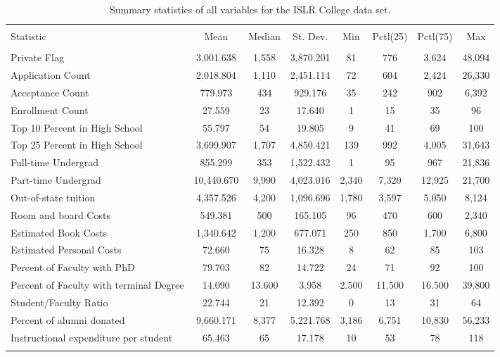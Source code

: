\documentclass{article}\usepackage[]{graphicx}\usepackage[]{color}
\begin{document}

\begin{table} \centering 
  \caption{Summary statistics of all variables for the ISLR College data set.} 
  \label{descrips} 
\begin{tabular}{@{\extracolsep{5pt}}lccccccc} 
\\[-1.8ex]\hline 
\hline \\[-1.8ex] 
Statistic & \multicolumn{1}{c}{Mean} & \multicolumn{1}{c}{Median} & \multicolumn{1}{c}{St. Dev.} & \multicolumn{1}{c}{Min} & \multicolumn{1}{c}{Pctl(25)} & \multicolumn{1}{c}{Pctl(75)} & \multicolumn{1}{c}{Max} \\ 
\hline \\[-1.8ex] 
Private Flag & 3,001.638 & 1,558 & 3,870.201 & 81 & 776 & 3,624 & 48,094 \\ 
Application Count & 2,018.804 & 1,110 & 2,451.114 & 72 & 604 & 2,424 & 26,330 \\ 
Acceptance Count & 779.973 & 434 & 929.176 & 35 & 242 & 902 & 6,392 \\ 
Enrollment Count & 27.559 & 23 & 17.640 & 1 & 15 & 35 & 96 \\ 
Top 10 Percent in High School & 55.797 & 54 & 19.805 & 9 & 41 & 69 & 100 \\ 
Top 25 Percent in High School & 3,699.907 & 1,707 & 4,850.421 & 139 & 992 & 4,005 & 31,643 \\ 
Full-time Undergrad & 855.299 & 353 & 1,522.432 & 1 & 95 & 967 & 21,836 \\ 
Part-time Undergrad & 10,440.670 & 9,990 & 4,023.016 & 2,340 & 7,320 & 12,925 & 21,700 \\ 
Out-of-state tuition & 4,357.526 & 4,200 & 1,096.696 & 1,780 & 3,597 & 5,050 & 8,124 \\ 
Room and board Costs & 549.381 & 500 & 165.105 & 96 & 470 & 600 & 2,340 \\ 
Estimated Book Costs & 1,340.642 & 1,200 & 677.071 & 250 & 850 & 1,700 & 6,800 \\ 
Estimated Personal Costs & 72.660 & 75 & 16.328 & 8 & 62 & 85 & 103 \\ 
Percent of Faculty with PhD & 79.703 & 82 & 14.722 & 24 & 71 & 92 & 100 \\ 
Percent of Faculty with terminal Degree & 14.090 & 13.600 & 3.958 & 2.500 & 11.500 & 16.500 & 39.800 \\ 
Student/Faculty Ratio & 22.744 & 21 & 12.392 & 0 & 13 & 31 & 64 \\ 
Percent of alumni donated & 9,660.171 & 8,377 & 5,221.768 & 3,186 & 6,751 & 10,830 & 56,233 \\ 
Instructional expenditure per student & 65.463 & 65 & 17.178 & 10 & 53 & 78 & 118 \\ 
\hline \\[-1.8ex] 
\end{tabular} 
\end{table} 
\end{document}
